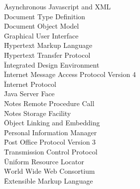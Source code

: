 \documentclass[oneside,bachelor,etd]{BYUPhys}
\begin{document}
\begin{tabbing}
 \= Asynchronous Javascript and XML\\
 \= Document Type Definition \\
 \= Document Object Model \\
 \= Graphical User Interface \\
 \= Hypertext Markup Language \\
 \= Hypertext Transfer Protocol \\
 \= Integrated Design Environment \\
 \= Internet Message Access Protocol Version 4 \\
 \= Internet Protocol \\
 \= Java Server Face \\
 \= Notes Remote Procedure Call \\
 \= Notes Storage Facility \\
 \= Object Linking and Embedding \\
 \= Personal Information Manager \\
 \= Post Office Protocol Version 3 \\
 \= Transmission Control Protocol \\
 \= Uniform Resource Locator \\
 \= World Wide Web Consortium \\
 \= Extensible Markup Language \\
		
\end{tabbing}
\end{document}
